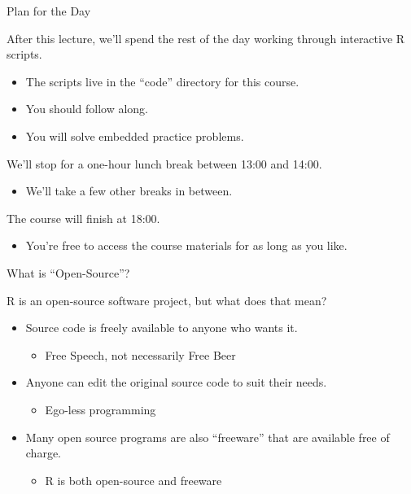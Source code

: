 \documentclass[10pt]{beamer}
\begin{document}
\begin{frame}{Plan for the Day}

  After this lecture, we'll spend the rest of the day working through
  interactive R scripts.
  \begin{itemize}
  \item The scripts live in the ``code'' directory for this course.
  \item You should follow along.
  \item You will solve embedded practice problems.
  \end{itemize}
  \vb
  We'll stop for a one-hour lunch break between 13:00 and 14:00.
  \begin{itemize}
  \item We'll take a few other breaks in between.
  \end{itemize}
  \vb
  The course will finish at 18:00.
  \begin{itemize}
  \item You're free to access the course materials for as long as you like.
  \end{itemize}
  
\end{frame}

  


\begin{frame}{What is ``Open-Source''?}

  R is an open-source software project, but what does that mean?
  \va
  \begin{itemize}
  \item Source code is freely available to anyone who wants it.
    \vb
    \begin{itemize}
    \item Free Speech, not necessarily Free Beer
    \end{itemize}
    \vb
  \item Anyone can edit the original source code to suit their needs.
    \vb
    \begin{itemize}
    \item Ego-less programming
    \end{itemize}
    \vb
  \item Many open source programs are also ``freeware'' that are available free
    of charge.
    \vb
    \begin{itemize}
    \item R is both open-source and freeware
    \end{itemize}
  \end{itemize}

\end{frame}
\end{document}
